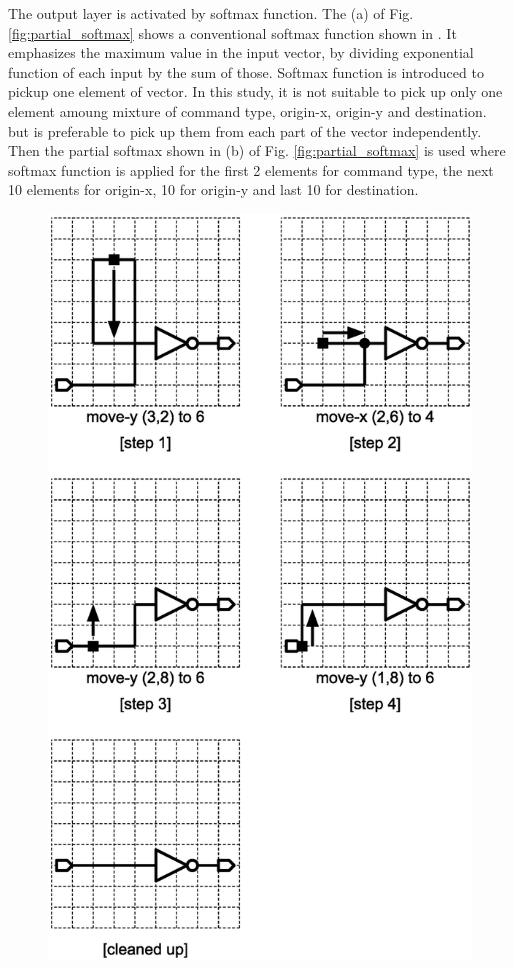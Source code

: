 \documentclass[twocolumn]{article}
\begin{document}
The output layer is activated by softmax function.
The (a) of Fig. \ref{fig:partial_softmax} shows a conventional softmax
function shown in \cite{mit}.
It emphasizes the maximum value in the input vector,
by dividing exponential function of each input by the sum of those.
Softmax function is introduced to pickup one element of vector.
In this study, it is not suitable to pick up only one element
amoung mixture of command type, origin-x, origin-y and destination.
but is preferable to pick up them from each part of the vector independently.
Then the partial softmax shown in (b) of Fig. \ref{fig:partial_softmax}
is used where softmax function is applied
for the first 2 elements for command type,
the next 10 elements for origin-x, 10 for origin-y and last 10 for destination.

\begin{figure}[tb]
 \begin{center}
  \begin{minipage}{\hsize}
   \includegraphics[width=\hsize]{fig/edit_steps_02.eps}

\end{minipage}
\end{center}
\end{figure}
\end{document}
